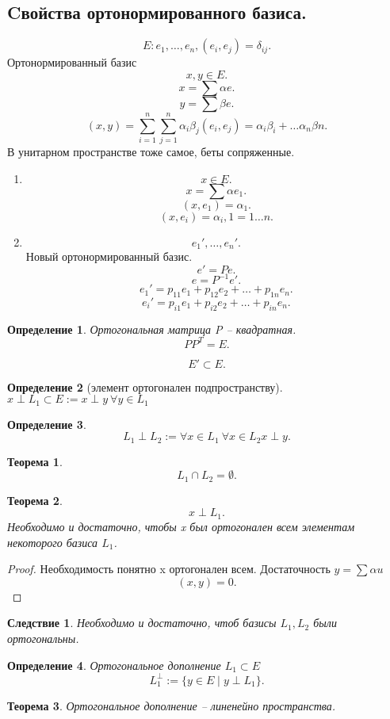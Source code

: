 \documentclass{scrartcl}
\newtheorem{theorem}{Теорема}
\newtheorem{definition}{Определение}
\newtheorem{corollary}{Следствие}[theorem]
\begin{document}
\subsection{Cвойства ортонормированного базиса.}
\[
E: e_1,\dots,e_{n}, (e_{i},e_{j}) = \delta_{ij}
.\] 
Ортонормированный базис
\[
x,y \in E
.\] 
\[
x = \sum \alpha e
.\] 
\[
y = \sum \beta e
.\] 
\[
    (x,y) = \sum_{i = 1}^{n} \sum_{j = 1}^{n} \alpha_{i} \beta_{j}(e_{i},e_{j})=
    \alpha_{i}\beta_{i} + \dots \alpha_{n}\beta{n}
.\] 
В унитарном пространстве тоже самое,  беты сопряженные.
\begin{enumerate}
    \item 
        \[
        x \in E
        .\] 
        \[
        x = \sum \alpha e_1
        .\] 
        \[
            (x,e_1) = \alpha_1
        .\] 
        \[
            (x ,e_{i}) = \alpha_{i} , 1 = 1\dots n
        .\] 
    \item
        \[
        e_1',\dots , e_{n}'
        .\] 
        Новый ортонормированный базис.
        \[
        e' = P e
        .\] 
        \[
        e = P^{-1}e'
        .\] 
        \[
        e_1' = p_{11}e_1 + p_{12}e_2 + \dots + p_{1n}e_{n}
        .\] 
        \[
        e_i' = p_{i1}e_1 + p_{i2}e_2 + \dots + p_{in}e_{n}
        .\] 
\end{enumerate}
\begin{definition}
    Ортогональная матрица
    P -- квадратная.
    \[
    P P^{T} = E
    .\] 
\end{definition}
\[
E' \subset E
.\] 
\begin{definition} [элемент ортогонален подпространству]
    $x \perp L_1 \subset E := x \perp y ~ \forall y \in L_1$
\end{definition}
\begin{definition}
    \[
    L_1 \perp L_2 := \forall  x \in L_1 ~ \forall x \in L_2 x \perp y
    .\] 
\end{definition}
\begin{theorem}
    \[
        L_1 \cap L_2 = {\emptyset}
    .\] 
\end{theorem}
\begin{theorem}
    \[
    x \perp L_1
    .\] 
    Необходимо и достаточно, чтобы x был ортогонален всем элементам некоторого базиса $L_1$.
\end{theorem}
\begin{proof}
    Необходимость понятно x ортогонален всем. Достаточность $y = \sum \alpha u$ 
    \[
        (x,y) = 0
    .\] 
\end{proof}
\begin{corollary}
    Необходимо и достаточно, чтоб базисы $L_1, L_2$ были ортогональны.
\end{corollary}
\begin{definition}
    Ортогональное дополнение $L_1 \subset E$
    \[
        L_1^{\perp} := \{y \in E \mid y \perp L_1\}
    .\] 
\end{definition}
\begin{theorem}
    Ортогональное дополнение -- линенейно пространства.
\end{theorem}
\end{document}
